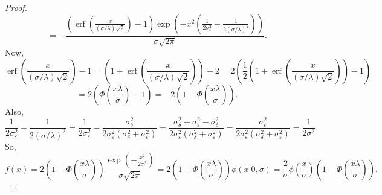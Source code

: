 \documentclass{article}
\newcommand{\ep}{\varepsilon}
\begin{document}
\begin{proof}
	$$= -\frac{\left(\operatorname{erf}\left(\frac{x}{(\sigma / \lambda) \sqrt{2}}\right) - 1\right) \exp\left(-x^2\left(\frac{1}{2\sigma_\ep^2} - \frac{1}{2(\sigma / \lambda)^2}\right)\right)}{\sigma\sqrt{2\pi}}.$$
	Now,
	$$\operatorname{erf}\left(\frac{x}{(\sigma / \lambda) \sqrt{2}}\right) - 1 = \left(1 + \operatorname{erf}\left(\frac{x}{(\sigma / \lambda) \sqrt{2}}\right)\right) - 2 = 2\left(\frac{1}{2}\left(1 + \operatorname{erf}\left(\frac{x}{(\sigma / \lambda) \sqrt{2}}\right)\right) - 1\right)$$
	$$= 2\left(\Phi\left(\frac{x\lambda}{\sigma}\right) - 1\right) = -2\left(1 - \Phi\left(\frac{x\lambda}{\sigma}\right)\right).$$
	Also,
	$$\frac{1}{2\sigma_\ep^2} - \frac{1}{2(\sigma / \lambda)^2} = \frac{1}{2\sigma_\ep^2} - \frac{\sigma_\delta^2}{2\sigma_\ep^2(\sigma_\delta^2 + \sigma_\ep^2)} = \frac{\sigma_\delta^2 + \sigma_\ep^2 - \sigma_\delta^2}{2\sigma_\ep^2(\sigma_\delta^2 + \sigma_\ep^2)} = \frac{\sigma_\ep^2}{2\sigma_\ep^2(\sigma_\delta^2 + \sigma_\ep^2)} = \frac{1}{2\sigma^2}.$$
	So,
	$$f(x) = 2\left(1 - \Phi\left(\frac{x\lambda}{\sigma}\right)\right)\frac{\exp\left(-\frac{x^2}{2\sigma^2}\right)}{\sigma\sqrt{2\pi}} = 2\left(1 - \Phi\left(\frac{x\lambda}{\sigma}\right)\right) \phi(x | 0, \sigma) = \frac{2}{\sigma}\phi\left(\frac{x}{\sigma}\right) \left(1 - \Phi\left(\frac{x\lambda}{\sigma}\right)\right).$$
\end{proof}
\end{document}
